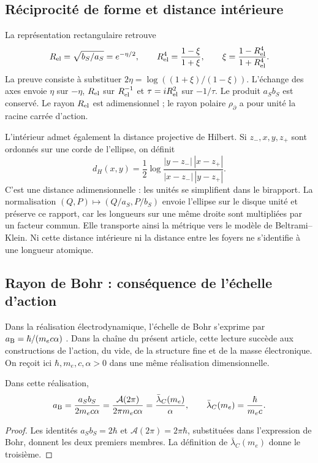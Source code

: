 \subsection{Réciprocité de forme et distance intérieure}

La représentation rectangulaire retrouve
\begin{equation}
 R_{\rm el}=\sqrt{b_S/a_S}=e^{-\eta/2},\qquad
 R_{\rm el}^4=\frac{1-\xi}{1+\xi},\qquad
 \xi=\frac{1-R_{\rm el}^4}{1+R_{\rm el}^4}.
 \label{eq:ii-elipse-reciproca}
\end{equation}
La preuve consiste à substituer
\(2\eta=\log((1+\xi)/(1-\xi))\). L'échange des axes
envoie \(\eta\) sur \(-\eta\), \(R_{\rm el}\) sur
\(R_{\rm el}^{-1}\) et \(\tau=iR_{\rm el}^2\) sur \(-1/\tau\).
Le produit \(a_Sb_S\) est conservé. Le rayon \(R_{\rm el}\) est adimensionnel ;
le rayon polaire \(\rho_{\partial}\) a pour unité la racine carrée d'action.

L'intérieur admet également la distance projective de Hilbert. Si
\(z_-,x,y,z_+\) sont ordonnés sur une corde de l'ellipse, on définit
\[
 d_H(x,y)=\frac12\log
 \frac{|y-z_-|\,|x-z_+|}{|x-z_-|\,|y-z_+|}.
\]
C'est une distance adimensionnelle : les unités se simplifient dans le birapport.
La normalisation \((Q,P)\mapsto(Q/a_S,P/b_S)\) envoie l'ellipse
sur le disque unité et préserve ce rapport, car les longueurs sur une
même droite sont multipliées par un facteur commun. Elle transporte ainsi la métrique
vers le modèle de Beltrami--Klein. Ni cette distance intérieure ni la distance
entre les foyers ne s'identifie à une longueur atomique.

\subsection{Rayon de Bohr : conséquence de l'échelle d'action}
\label{sec:ii-elipse-bohr}

Dans la réalisation électrodynamique, l'échelle de Bohr s'exprime par
\(a_{\rm B}=\hbar/(m_ec\alpha)\) \cite{codata2022}. Dans la chaîne
du présent article, cette lecture succède aux constructions de
l'action, du vide, de la structure fine et de la masse électronique. On reçoit ici
\(\hbar,m_e,c,\alpha>0\) dans une même réalisation dimensionnelle.
\begin{proposition}
\label{prop:ii-elipse-bohr}
Dans cette réalisation,
\begin{equation}
 a_{\rm B}=\frac{a_Sb_S}{2m_ec\alpha}
 =\frac{\mathcal A(2\pi)}{2\pi m_ec\alpha}
 =\frac{\bar\lambda_C(m_e)}{\alpha},\qquad
 \bar\lambda_C(m_e)=\frac{\hbar}{m_ec}.
 \label{eq:ii-elipse-bohr}
\end{equation}
\end{proposition}
\begin{proof}
Les identités \(a_Sb_S=2\hbar\) et
\(\mathcal A(2\pi)=2\pi\hbar\), substituées dans l'expression
de Bohr, donnent les deux premiers membres. La définition de
\(\bar\lambda_C(m_e)\) donne le troisième.
\end{proof}

